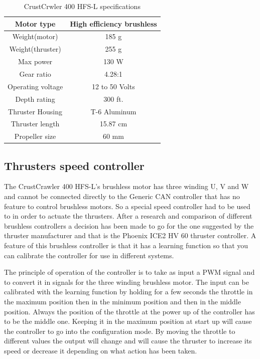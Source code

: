 \begin{table}[h]
\centering
    \caption{CrustCrwler 400 HFS-L specifications}
    \begin{tabular}{|c|c|} \hline
    \label{table:one_column}
       Motor type    &  High efficiency brushless \\ \hline
       Weight(motor) & 185 g \\ \hline
         Weight(thruster) & 255 g \\ \hline
           Max power &  130 W \\ \hline
             Gear ratio & 4.28:1 \\ \hline
               Operating voltage & 12 to 50 Volts \\ \hline
                 Depth rating  & 300 ft. \\ \hline
                   Thruster Housing & T-6 Aluminum \\ \hline
                     Thruster length & 15.87 cm \\ \hline  
                      Propeller size & 60 mm \\ \hline
     
    \end{tabular}
\end{table}
 
\subsection{Thrusters speed controller}
The CrustCrawler 400 HFS-L's brushless motor has three winding U, V and W and cannot be connected directly to the Generic CAN controller that has no feature to control brushless motors. So a special speed controller had to be used to in order to actuate the thrusters. After a research and comparison of different brushless controllers a decision has been made to go for the one suggested by the thruster manufacturer and that is the Phoenix ICE2 HV 60 thruster controller. A feature of this brushless controller is that it has a learning function so that you can calibrate the controller for use in different systems. 

The principle of operation of the controller is to take as input a PWM signal and to convert it in signals for the three winding brushless motor. The input can be calibrated with the learning function by holding for  a few seconds the throttle in the maximum position then in the minimum position and then in the middle position. Always the position of the throttle at the power up of the controller has to be the middle one. Keeping it in the maximum position at start up will cause the controller to go into the configuration mode. By moving the throttle to different values the output will change and will cause the thruster to increase its speed or decrease it depending on what action has been taken. 
